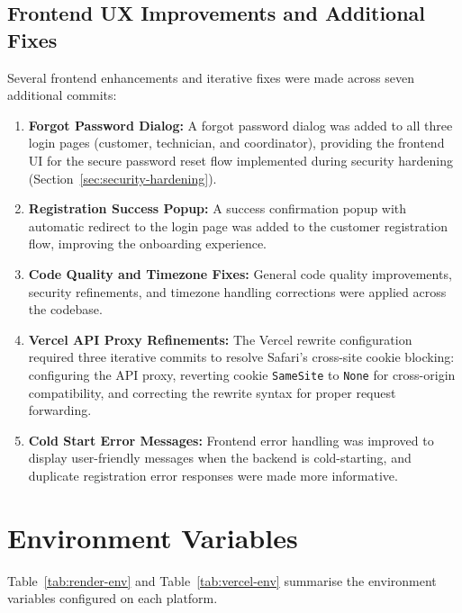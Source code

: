 \documentclass[conference]{IEEEtran}
\begin{document}
\subsection{Frontend UX Improvements and Additional Fixes}

Several frontend enhancements and iterative fixes were made across seven additional commits:

\begin{enumerate}
    \item \textbf{Forgot Password Dialog:} A forgot password dialog was added to all three login pages (customer, technician, and coordinator), providing the frontend UI for the secure password reset flow implemented during security hardening (Section~\ref{sec:security-hardening}).
    \item \textbf{Registration Success Popup:} A success confirmation popup with automatic redirect to the login page was added to the customer registration flow, improving the onboarding experience.
    \item \textbf{Code Quality and Timezone Fixes:} General code quality improvements, security refinements, and timezone handling corrections were applied across the codebase.
    \item \textbf{Vercel API Proxy Refinements:} The Vercel rewrite configuration required three iterative commits to resolve Safari's cross-site cookie blocking: configuring the API proxy, reverting cookie \texttt{SameSite} to \texttt{None} for cross-origin compatibility, and correcting the rewrite syntax for proper request forwarding.
    \item \textbf{Cold Start Error Messages:} Frontend error handling was improved to display user-friendly messages when the backend is cold-starting, and duplicate registration error responses were made more informative.
\end{enumerate}

\section{Environment Variables}

Table~\ref{tab:render-env} and Table~\ref{tab:vercel-env} summarise the environment variables configured on each platform.
\end{document}
